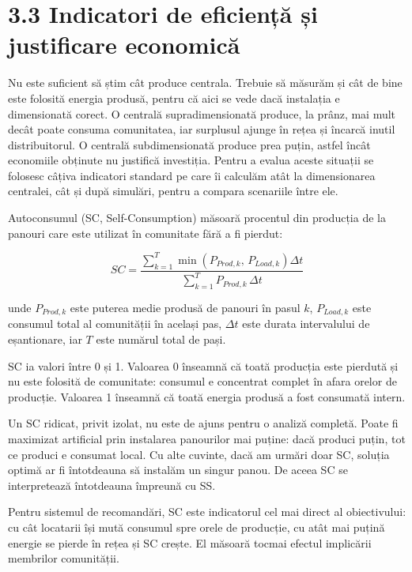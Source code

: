 \documentclass[12pt,a4paper]{report}
\begin{document}
\section*{3.3 Indicatori de eficiență și justificare economică}

Nu este suficient să știm cât produce centrala. Trebuie să măsurăm și cât de bine este folosită energia produsă, pentru că aici se vede dacă instalația e dimensionată corect. O centrală supradimensionată produce, la prânz, mai mult decât poate consuma comunitatea, iar surplusul ajunge în rețea și încarcă inutil distribuitorul. O centrală subdimensionată produce prea puțin, astfel încât economiile obținute nu justifică investiția. Pentru a evalua aceste situații se folosesc câțiva indicatori standard pe care îi calculăm atât la dimensionarea centralei, cât și după simulări, pentru a compara scenariile între ele.

Autoconsumul (SC, Self-Consumption) măsoară procentul din producția de la panouri care este utilizat în comunitate fără a fi pierdut:

\begin{equation}
  SC = \frac{\displaystyle\sum_{k=1}^{T} \min\!\left(P_{Prod,k},\, P_{Load,k}\right) \Delta t}{\displaystyle\sum_{k=1}^{T} P_{Prod,k}\, \Delta t}
  \label{eq:sc}
\end{equation}

unde $P_{Prod,k}$ este puterea medie produsă de panouri în pasul $k$, $P_{Load,k}$ este consumul total al comunității în același pas, $\Delta t$ este durata intervalului de eșantionare, iar $T$ este numărul total de pași.

SC ia valori între 0 și 1. Valoarea 0 înseamnă că toată producția este pierdută și nu este folosită de comunitate: consumul e concentrat complet în afara orelor de producție. Valoarea 1 înseamnă că toată energia produsă a fost consumată intern.

Un SC ridicat, privit izolat, nu este de ajuns pentru o analiză completă. Poate fi maximizat artificial prin instalarea panourilor mai puține: dacă produci puțin, tot ce produci e consumat local. Cu alte cuvinte, dacă am urmări doar SC, soluția optimă ar fi întotdeauna să instalăm un singur panou. De aceea SC se interpretează întotdeauna împreună cu SS.

Pentru sistemul de recomandări, SC este indicatorul cel mai direct al obiectivului: cu cât locatarii își mută consumul spre orele de producție, cu atât mai puțină energie se pierde în rețea și SC crește. El măsoară tocmai efectul implicării membrilor comunității.
\end{document}
